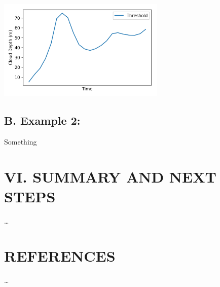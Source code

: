 \documentclass[11pt]{article}
\begin{document}
\begin{center}
\includegraphics[width=0.6\textwidth]{./images/regression.png}
\end{center}


\subsection*{B. Example 2:}
\label{sec:org304432c}

Something

\section*{VI. SUMMARY AND NEXT STEPS}
\label{sec:org36ac305}

\ldots{}

\section*{REFERENCES}
\label{sec:orgf848537}

\ldots{}
\end{document}
